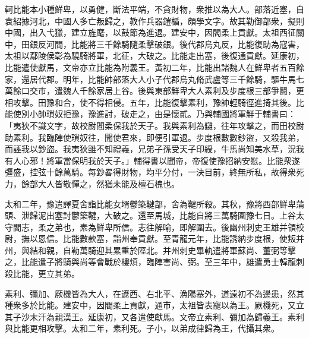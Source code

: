 \begin{pinyinscope}
 
 
 軻比能本小種鮮卑，以勇健，斷法平端，不貪財物，衆推以為大人。部落近塞，自袁紹據河北，中國人多亡叛歸之，教作兵器鎧楯，頗學文字。故其勒御部衆，擬則中國，出入弋獵，建立旌麾，以鼓節為進退。建安中，因閻柔上貢獻。太祖西征關中，田銀反河間，比能將三千餘騎隨柔擊破銀。後代郡烏丸反，比能復助為寇害，太祖以鄢陵侯彰為驍騎將軍，北征，大破之。比能走出塞，後復通貢獻。延康初，比能遣使獻馬，文帝亦立比能為附義王。黃初二年，比能出諸魏人在鮮卑者五百餘家，還居代郡。明年，比能帥部落大人小子代郡烏丸脩武盧等三千餘騎，驅牛馬七萬餘口交市，遣魏人千餘家居上谷。後與東部鮮卑大人素利及步度根三部爭鬪，更相攻擊。田豫和合，使不得相侵。五年，比能復擊素利，豫帥輕騎徑進掎其後。比能使別小帥瑣奴拒豫，豫進討，破走之，由是懷貳。乃與輔國將軍鮮于輔書曰：「夷狄不識文字，故校尉閻柔保我於天子。我與素利為讎，往年攻擊之，而田校尉助素利。我臨陣使瑣奴往，聞使君來，即便引軍退。步度根數數鈔盜，又殺我弟，而誣我以鈔盜。我夷狄雖不知禮義，兄弟子孫受天子印綬，牛馬尚知美水草，況我有人心邪！將軍當保明我於天子。」輔得書以聞帝，帝復使豫招納安慰。比能衆遂彊盛，控弦十餘萬騎。每鈔畧得財物，均平分付，一決目前，終無所私，故得衆死力，餘部大人皆敬憚之，然猶未能及檀石槐也。
 
 
 
 
 太和二年，豫遣譯夏舍詣比能女壻鬱築鞬部，舍為鞬所殺。其秋，豫將西部鮮卑蒲頭、泄歸泥出塞討鬱築鞬，大破之。還至馬城，比能自將三萬騎圍豫七日。上谷太守閻志，柔之弟也，素為鮮卑所信。志往解喻，即解圍去。後幽州刺史王雄并領校尉，撫以恩信。比能數款塞，詣州奉貢獻。至青龍元年，比能誘納步度根，使叛并州，與結和親，自勒萬騎迎其累重於陘北。并州刺史畢軌遣將軍蘇尚、董弼等擊之，比能遣子將騎與尚等會戰於樓煩，臨陣害尚、弼。至三年中，雄遣勇士韓龍刺殺比能，更立其弟。
 
 
 
 
 素利、彌加、厥機皆為大人，在遼西、右北平、漁陽塞外，道遠初不為邊患，然其種衆多於比能。建安中，因閻柔上貢獻，通市，太祖皆表寵以為王。厥機死，又立其子沙末汗為親漢王。延康初，又各遣使獻馬。文帝立素利、彌加為歸義王。素利與比能更相攻擊。太和二年，素利死。子小，以弟成律歸為王，代攝其衆。
 
 
\end{pinyinscope}